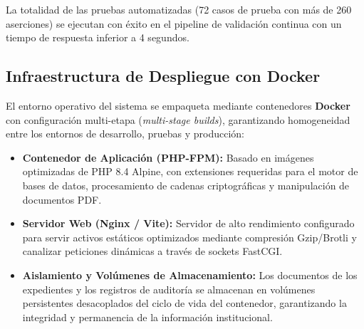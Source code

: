 La totalidad de las pruebas automatizadas (72 casos de prueba con más de 260 aserciones) se ejecutan con éxito en el pipeline de validación continua con un tiempo de respuesta inferior a 4 segundos.

\subsection{Infraestructura de Despliegue con Docker}

El entorno operativo del sistema se empaqueta mediante contenedores \textbf{Docker} con configuración multi-etapa (\textit{multi-stage builds}), garantizando homogeneidad entre los entornos de desarrollo, pruebas y producción:

\begin{itemize}
    \item \textbf{Contenedor de Aplicación (PHP-FPM):} Basado en imágenes optimizadas de PHP 8.4 Alpine, con extensiones requeridas para el motor de bases de datos, procesamiento de cadenas criptográficas y manipulación de documentos PDF.
    \item \textbf{Servidor Web (Nginx / Vite):} Servidor de alto rendimiento configurado para servir activos estáticos optimizados mediante compresión Gzip/Brotli y canalizar peticiones dinámicas a través de sockets FastCGI.
    \item \textbf{Aislamiento y Volúmenes de Almacenamiento:} Los documentos de los expedientes y los registros de auditoría se almacenan en volúmenes persistentes desacoplados del ciclo de vida del contenedor, garantizando la integridad y permanencia de la información institucional.
\end{itemize}

